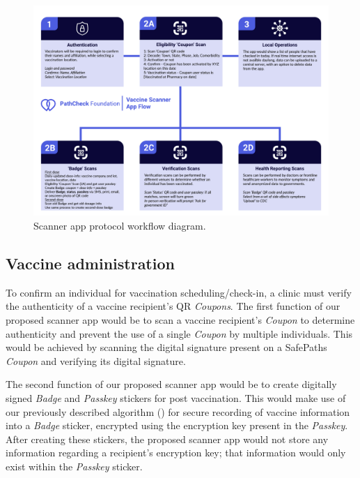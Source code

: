 \begin{figure}[!ht]
\begin{center}
\includegraphics[width=13.5cm]{images/scanner_protocol.pdf}
\end{center}
\caption{Scanner app protocol workflow diagram.}
\label{scanner-workflow}
\end{figure}


\subsection{Vaccine administration}
To confirm an individual for vaccination scheduling/check-in, a clinic must verify the authenticity of a vaccine recipient’s QR \textit{Coupons}. The first function of our proposed scanner app would be to scan a vaccine recipient’s \textit{Coupon} to determine authenticity and prevent the use of a single \textit{Coupon} by multiple individuals. This would be achieved by scanning the digital signature present on a SafePaths \textit{Coupon} and verifying its digital signature. 

The second function of our proposed scanner app would be to create digitally signed \textit{Badge} and \textit{Passkey} stickers for post vaccination. This would make use of our previously described algorithm (\cite{crypt}) for secure recording of vaccine information into a \textit{Badge} sticker, encrypted using the encryption key present in the \textit{Passkey}. After creating these stickers, the proposed scanner app would not store any information regarding a recipient’s encryption key; that information would only exist within the \textit{Passkey} sticker. 


